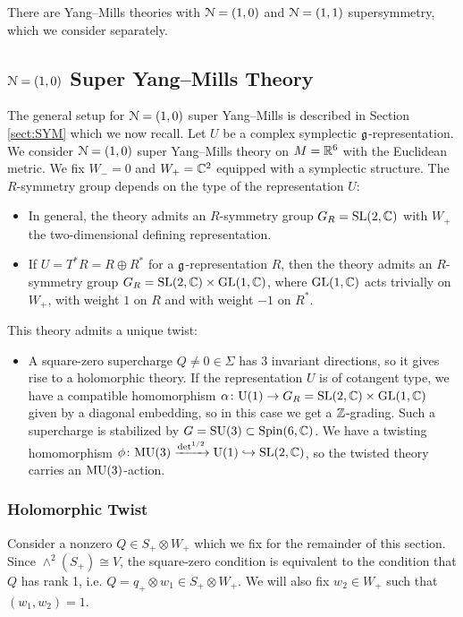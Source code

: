 \documentclass[10pt, oneside]{article}
\begin{document}
There are Yang--Mills theories with $\mathcal N=(1, 0)$ and $\mathcal N=(1, 1)$ supersymmetry, which we consider separately.

\subsection{\texorpdfstring{$\mathcal N=(1, 0)$}{N=(1, 0)} Super Yang--Mills Theory}

The general setup for $\mathcal N=(1, 0)$ super Yang--Mills is described in Section \ref{sect:SYM} which we now recall. Let $U$ be a complex symplectic $\mathfrak g$-representation. We consider $\mathcal N=(1, 0)$ super Yang--Mills theory on $M=\mathbb R^6$ with the Euclidean metric. We fix $W_- = 0$ and $W_+=\mathbb C^2$ equipped with a symplectic structure. The $R$-symmetry group depends on the type of the representation $U$:
\begin{itemize}
\item In general, the theory admits an $R$-symmetry group $G_R=\mathrm{SL}(2, \mathbb C)$ with $W_+$ the two-dimensional defining representation.

\item If $U = T^* R=R\oplus R^*$ for a $\mathfrak g$-representation $R$, then the theory admits an $R$-symmetry group $G_R=\mathrm{SL}(2, \mathbb C)\times \mathrm{GL}(1, \mathbb C)$, where $\mathrm{GL}(1, \mathbb C)$ acts trivially on $W_+$, with weight $1$ on $R$ and with weight $-1$ on $R^*$.
\end{itemize}

This theory admits a unique twist:
\begin{itemize}
\item A square-zero supercharge $Q\neq 0\in\Sigma$ has 3 invariant directions, so it gives rise to a holomorphic theory. If the representation $U$ is of cotangent type, we have a compatible homomorphism $\alpha\colon \mathrm{U}(1)\rightarrow G_R=\mathrm{SL}(2, \mathbb C)\times \mathrm{GL}(1, \mathbb C)$ given by a diagonal embedding, so in this case we get a $\mathbb Z$-grading. Such a supercharge is stabilized by $G=\mathrm{SU}(3)\subset \mathrm{Spin}(6, \mathbb C)$. We have a twisting homomorphism $\phi\colon\mathrm{MU}(3)\xrightarrow{\det^{1/2}}\mathrm{U}(1)\hookrightarrow \mathrm{SL}(2, \mathbb C)$, so the twisted theory carries an $\mathrm{MU}(3)$-action.
\end{itemize}

\subsubsection{Holomorphic Twist}
\label{sect:6dholomorphictwist}

Consider a nonzero $Q\in S_+\otimes W_+$ which we fix for the remainder of this section. Since $\wedge^2(S_+)\cong V$, the square-zero condition is equivalent to the condition that $Q$ has rank 1, i.e. $Q=q_+\otimes w_1\in S_+\otimes W_+$. We will also fix $w_2\in W_+$ such that $(w_1, w_2) = 1$.
\end{document}
